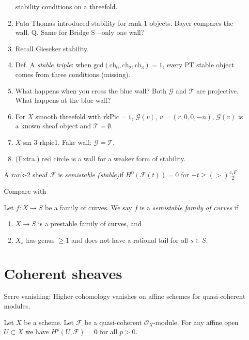 \begin{enumerate}
stability conditions on a threefold.
\item Pata-Thomas introduced stability for rank 1 objects.
Bayer compares the---wall. Q. Same for Bridge S---only one wall?
\item Recall Gieseker stability.
\medskip
\item Def. A {\it stable triple}: when
$\text{gcd}(\text{ch}_0,\text{ch}_2,\text{ch}_3)=1$, every PT stable object
comes from three conditions (missing).
\item What happens when you cross the blue wall? 
Both $\mathcal{G}$ and $\mathcal{T}$ are projective. What happens at the blue
wall?
\medskip
\item For $X$ smooth threefold with $\text{rk}\text{Pic}=1$, $\mathcal{G}(v)$,
$v=(r,0,0,-n)$, $\mathcal{G}(v)$ is a known sheaf object and
$\mathcal{T}=\emptyset$.
\item $X$ sm 3 rkpic1, Fake wall; $\mathcal{G}=\mathcal{T}$.
\item (Extra.) red circle is a wall for a weaker form of stability.
\end{enumerate}
\begin{definition}
\label{definition-slope-stability}
A rank-2 sheaf $\mathcal{F}$ is {\it semistable (stable)}if
$H^{0}(\mathcal{F}(t))=0$ for $-t \geq(>) \frac{c_1F}{2}$
\end{definition}

Compare with

\begin{definition}
\label{definition-semistable}
Let $f : X \to S$ be a family of curves.
We say $f$ is a {\it semistable family of curves} if
\begin{enumerate}
\item $X \to S$ is a prestable family of curves, and
\item $X_s$ has genus $\geq 1$ and
does not have a rational tail for all $s \in S$.
\end{enumerate}
\end{definition}

\section{Coherent sheaves}
\label{section-coherent-sheaves}

\begin{lemma}
\label{lemma-quasi-coherent-affine-cohomology-zero}
\begin{slogan}
Serre vanishing: Higher cohomology vanishes on affine schemes
for quasi-coherent modules.
\end{slogan}
Let $X$ be a scheme.
Let $\mathcal{F}$ be a quasi-coherent $\mathcal{O}_X$-module.
For any affine open $U \subset X$ we have
$H^p(U, \mathcal{F}) = 0$ for all $p > 0$.
\end{lemma}

